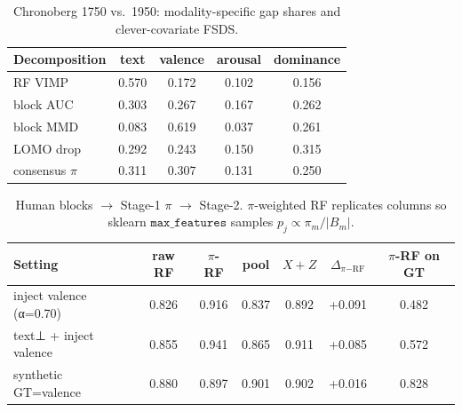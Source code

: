 \begin{table}[t]
\centering
\small
\caption{Chronoberg 1750 vs.\ 1950: modality-specific gap shares and clever-covariate FSDS.}
\begin{tabular}{lcccc}
\toprule
Decomposition & text & valence & arousal & dominance \\
\midrule
RF VIMP & 0.570 & 0.172 & 0.102 & 0.156 \\
block AUC & 0.303 & 0.267 & 0.167 & 0.262 \\
block MMD & 0.083 & 0.619 & 0.037 & 0.261 \\
LOMO drop & 0.292 & 0.243 & 0.150 & 0.315 \\
consensus $\pi$ & 0.311 & 0.307 & 0.131 & 0.250 \\
\bottomrule
\end{tabular}
\end{table}

\begin{table}[t]
\centering
\small
\caption{Human blocks $\to$ Stage-1 $\pi$ $\to$ Stage-2. $\pi$-weighted RF replicates columns so sklearn $\mathtt{max\_features}$ samples $p_j\propto\pi_m/|B_m|$.}
\begin{tabular}{lcccccc}
\toprule
Setting & raw RF & $\pi$-RF & pool & $X{+}Z$ & $\Delta_{\pi\mathrm{-RF}}$ & $\pi$-RF on GT \\
\midrule
inject valence (α=0.70) & 0.826 & 0.916 & 0.837 & 0.892 & +0.091 & 0.482 \\
text⊥ + inject valence & 0.855 & 0.941 & 0.865 & 0.911 & +0.085 & 0.572 \\
synthetic GT=valence & 0.880 & 0.897 & 0.901 & 0.902 & +0.016 & 0.828 \\
\bottomrule
\end{tabular}
\end{table}

